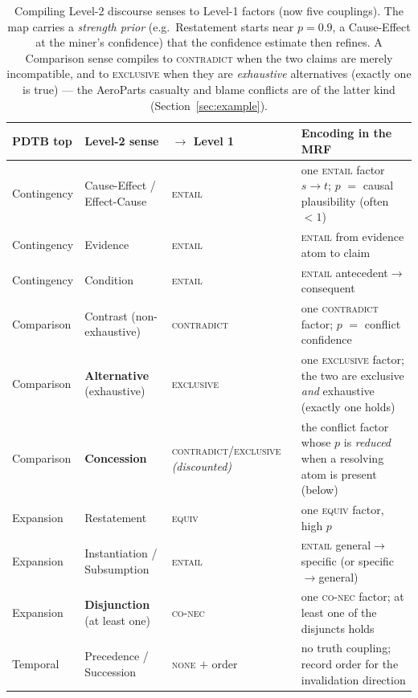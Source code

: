 \documentclass[11pt]{article}
\begin{document}
\begin{table}[h]\centering\small
\renewcommand{\arraystretch}{1.15}
\begin{tabular}{@{}p{2.3cm}p{3.2cm}p{2.0cm}p{5.6cm}@{}}
\toprule
\textbf{PDTB top} & \textbf{Level-2 sense} & \textbf{$\to$ Level 1} & \textbf{Encoding in the MRF}\\
\midrule
Contingency & Cause-Effect / Effect-Cause & \textsc{entail} & one \textsc{entail} factor $s\!\to\!t$; $p$ $=$ causal plausibility (often $<1$)\\
Contingency & Evidence & \textsc{entail} & \textsc{entail} from evidence atom to claim\\
Contingency & Condition & \textsc{entail} & \textsc{entail} antecedent$\to$consequent\\
Comparison  & Contrast (non-exhaustive) & \textsc{contradict} & one \textsc{contradict} factor; $p$ $=$ conflict confidence\\
Comparison  & \textbf{Alternative} (exhaustive) & \textsc{exclusive} & one \textsc{exclusive} factor; the two are exclusive \emph{and} exhaustive (exactly one holds)\\
Comparison  & \textbf{Concession} & \textsc{contradict}/\textsc{exclusive} \emph{(discounted)} & the conflict factor whose $p$ is \emph{reduced} when a resolving atom is present (below)\\
Expansion   & Restatement & \textsc{equiv} & one \textsc{equiv} factor, high $p$\\
Expansion   & Instantiation / Subsumption & \textsc{entail} & \textsc{entail} general$\to$specific (or specific$\to$general)\\
Expansion   & \textbf{Disjunction} (at least one) & \textsc{co-nec} & one \textsc{co-nec} factor; at least one of the disjuncts holds\\
Temporal    & Precedence / Succession & \textsc{none} $+$ order & no truth coupling; record order for the invalidation direction\\
\bottomrule
\end{tabular}
\caption{Compiling Level-2 discourse senses to Level-1 factors (now five couplings). The map
carries a \emph{strength prior} (e.g.\ Restatement starts near $p{=}0.9$, a Cause-Effect at
the miner's confidence) that the confidence estimate then refines. A Comparison sense compiles
to \textsc{contradict} when the two claims are merely incompatible, and to \textsc{exclusive}
when they are \emph{exhaustive} alternatives (exactly one is true) --- the AeroParts casualty
and blame conflicts are of the latter kind (Section~\ref{sec:example}).}
\label{tab:compile}
\end{table}
\end{document}
